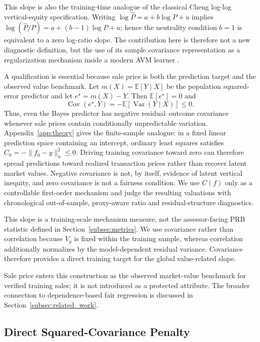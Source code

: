 \documentclass[10pt]{article}
\theoremstyle{definition}
\newcommand{\E}{\mathbb{E}}
\newcommand{\Cov}{\operatorname{Cov}}
\newcommand{\Var}{\operatorname{Var}}
\newcommand{\1}{\mathbf{1}}
\begin{document}
This slope is also the training-time analogue of the classical Cheng log-log vertical-equity specification. Writing $\log \widehat P=a+b\log P+u$ implies $\log(\widehat P/P)=a+(b-1)\log P+u$; hence the neutrality condition $b=1$ is equivalent to a zero log-ratio slope. The contribution here is therefore not a new diagnostic definition, but the use of its sample covariance representation as a regularization mechanism inside a modern AVM learner \cite{Cheng1974,SundermanEtAl1990,McMillenSingh2023}.


A qualification is essential because sale price is both the prediction target and the observed value benchmark. Let $m(X)=\E[Y\mid X]$ be the population squared-error predictor and let $e^\star=m(X)-Y$. Then $\E[e^\star]=0$ and
\begin{equation}
\label{eq:bayes_residual_covariance}
\Cov(e^\star,Y)=-\E\!\left[\Var(Y\mid X)\right]\leq0.
\end{equation}
Thus, even the Bayes predictor has negative residual--outcome covariance whenever sale prices contain conditionally unpredictable variation. Appendix~\ref{app:theory} gives the finite-sample analogue: in a fixed linear prediction space containing an intercept, ordinary least squares satisfies $C_0=-\lVert f_0-y\rVert_n^2\leq0$. Driving training covariance toward zero can therefore spread predictions toward realized transaction prices rather than recover latent market values. Negative covariance is not, by itself, evidence of latent vertical inequity, and zero covariance is not a fairness condition. We use $C(f)$ only as a controllable first-order mechanism and judge the resulting valuations with chronological out-of-sample, proxy-aware ratio and residual-structure diagnostics.

{This slope is a training-scale mechanism measure, not the assessor-facing PRB statistic defined in Section~\ref{subsec:metrics}. We use covariance rather than correlation because $V_y$ is fixed within the training sample, whereas correlation additionally normalizes by the model-dependent residual variance. Covariance therefore provides a direct training target for the global value-related slope.}

{Sale price enters this construction as the observed market-value benchmark for verified training sales; it is not introduced as a protected attribute. The broader connection to dependence-based fair regression is discussed in Section~\ref{subsec:related_work}.}


\subsection{Direct Squared-Covariance Penalty}
\label{subsec:direct_penalty}
\end{document}
